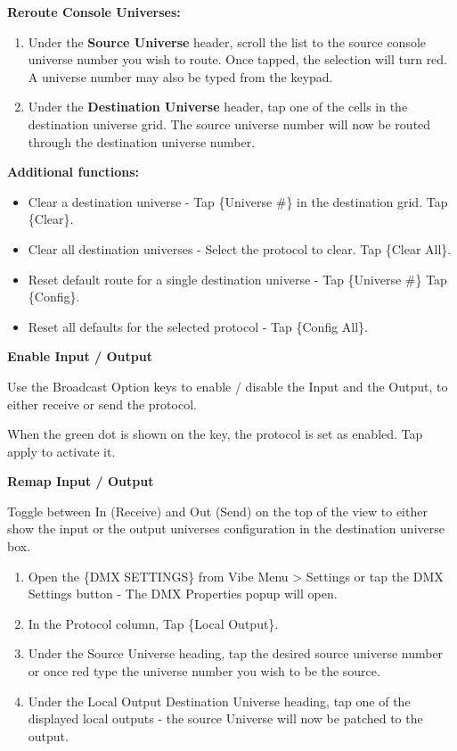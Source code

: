 \documentclass[
]{article}
\begin{document}
\textbf{Reroute Console Universes:}

\begin{enumerate}
\def\labelenumi{\arabic{enumi}.}
\item
  Under the \textbf{Source Universe} header, scroll the list to the source console universe number you wish to route. Once tapped, the selection will turn red. A universe number may also be typed from the keypad.
\item
  Under the \textbf{Destination Universe} header, tap one of the cells in the destination universe grid. The source universe number will now be routed through the destination universe number.
\end{enumerate}

\textbf{Additional functions:}

\begin{itemize}
\item
  Clear a destination universe - Tap \{Universe \#\} in the destination grid. Tap \{Clear\}.
\item
  Clear all destination universes - Select the protocol to clear. Tap \{Clear All\}.
\item
  Reset default route for a single destination universe - Tap \{Universe \#\} Tap \{Config\}.
\item
  Reset all defaults for the selected protocol - Tap \{Config All\}.
\end{itemize}

\textbf{Enable Input / Output}

Use the Broadcast Option keys to enable / disable the Input and the Output, to either receive or send the protocol.

When the green dot is shown on the key, the protocol is set as enabled. Tap apply to activate it.

\textbf{Remap Input / Output}

Toggle between In (Receive) and Out (Send) on the top of the view to either show the input or the output universes configuration in the destination universe box.

\begin{enumerate}
\def\labelenumi{\arabic{enumi}.}
\item
  Open the \{DMX SETTINGS\} from Vibe Menu \textgreater{} Settings or tap the DMX Settings button - The DMX Properties popup will open.
\item
  In the Protocol column, Tap \{Local Output\}.
\item
  Under the Source Universe heading, tap the desired source universe number or once red type the universe number you wish to be the source.
\item
  Under the Local Output Destination Universe heading, tap one of the displayed local outputs - the source Universe will now be patched to the output.
\end{enumerate}
\end{document}
